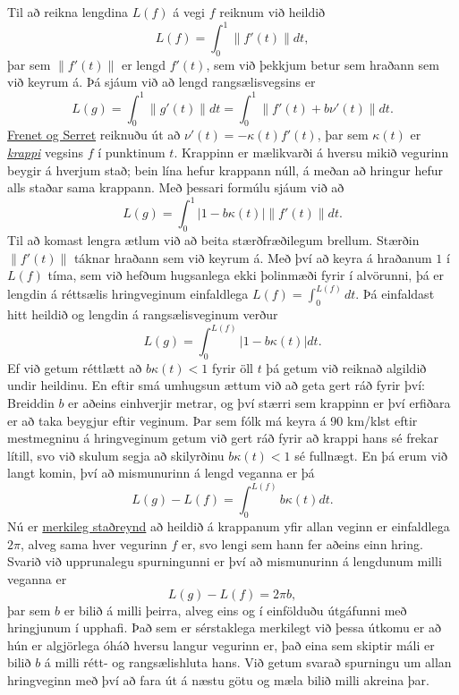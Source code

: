 \documentclass[10pt,a4paper]{amsart}
\begin{document}
Til að reikna lengdina $L(f)$ á vegi $f$ reiknum við heildið
$$
L(f) = \int_0^1 \|f'(t)\| dt,
$$
þar sem $\|f'(t)\|$ er lengd $f'(t)$, sem við þekkjum betur sem hraðann sem við
keyrum á. Þá sjáum við að lengd rangsælisvegsins er
$$
L(g) = \int_0^1 \|g'(t)\| dt
= \int_0^1 \|f'(t) + b \nu'(t)\| dt.
$$
\href{https://en.wikipedia.org/wiki/Frenet%E2%80%93Serret_formulas}{Frenet og Serret} reiknuðu út að $\nu'(t) = - \kappa(t) f'(t)$, þar sem
	$\kappa(t)$ er \href{https://en.wikipedia.org/wiki/Curvature#Plane_curves}{\emph{krappi}} vegsins $f$ í punktinum $t$. Krappinn er mælikvarði á
	hversu mikið vegurinn beygir á hverjum stað; bein lína hefur krappann núll, á
	meðan að hringur hefur alls staðar sama krappann. Með þessari formúlu sjáum við
	að
	$$
	L(g) = \int_0^1 |1 - b\kappa(t)| \|f'(t)\| dt.
	$$
	Til að komast lengra ætlum við að beita stærðfræðilegum brellum. Stærðin
	$\|f'(t)\|$ táknar hraðann sem við keyrum á. Með því að keyra á hraðanum $1$
	í $L(f)$ tíma, sem við hefðum hugsanlega ekki þolinmæði fyrir í
	alvörunni, þá er lengdin á réttsælis hringveginum einfaldlega $L(f) =
	\int_0^{L(f)} dt$. Þá einfaldast hitt heildið og lengdin á rangsælisveginum
	verður
	$$
	L(g) = \int_0^{L(f)} |1 - b\kappa(t)| dt.
	$$
	Ef við getum réttlætt að $b\kappa(t) < 1$ fyrir öll $t$ þá getum við reiknað
	algildið undir heildinu. En eftir smá umhugsun ættum við að geta gert ráð fyrir því:
	Breiddin $b$ er aðeins einhverjir metrar, og því stærri sem krappinn er því
	erfiðara er að taka beygjur eftir veginum. Þar sem fólk má keyra á 90 km/klst
	eftir mestmegninu á hringveginum getum við gert ráð fyrir að krappi hans sé
	frekar lítill, svo við skulum segja að skilyrðinu $b\kappa(t) < 1$ sé fullnægt.
	En þá erum við langt komin, því að mismunurinn á lengd veganna er þá
	$$
	L(g) - L(f)
	= \int_0^{L(f)} b \kappa(t) dt.
	$$
	Nú er \href{https://en.wikipedia.org/wiki/Total_curvature}{merkileg staðreynd} að heildið á krappanum yfir allan veginn er
	einfaldlega $2\pi$, alveg sama hver vegurinn $f$ er, svo lengi sem hann fer
	aðeins einn hring. Svarið við upprunalegu spurningunni er því að mismunurinn á
	lengdunum milli veganna er
	$$
	L(g) - L(f)
	= 2 \pi b,
	$$
	þar sem $b$ er bilið á milli þeirra, alveg eins og í einfölduðu útgáfunni með hringjunum í upphafi.
	Það sem er sérstaklega merkilegt við þessa útkomu er að hún er algjörlega óháð hversu langur vegurinn er, það eina sem skiptir máli er bilið $b$ á milli rétt- og rangsælishluta hans.
	Við getum svarað spurningu um allan hringveginn með því að fara út á næstu götu og mæla bilið milli akreina þar.
\end{document}

